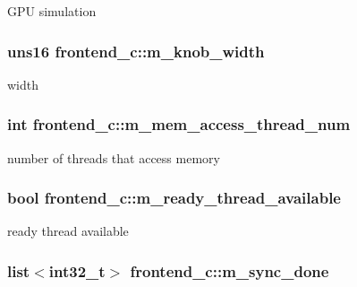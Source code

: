 \label{classfrontend__c_a30a952873e134a3f296ac90efee193f6}
GPU simulation \hypertarget{classfrontend__c_a7ed5014f79e26e431bff9ffa7b52121b}{
\subsubsection[{m\_\-knob\_\-width}]{\setlength{\rightskip}{0pt plus 5cm}uns16 {\bf frontend\_\-c::m\_\-knob\_\-width}}}
\label{classfrontend__c_a7ed5014f79e26e431bff9ffa7b52121b}
width \hypertarget{classfrontend__c_a172f7f7447242af7808f4a68821194d2}{
\subsubsection[{m\_\-mem\_\-access\_\-thread\_\-num}]{\setlength{\rightskip}{0pt plus 5cm}int {\bf frontend\_\-c::m\_\-mem\_\-access\_\-thread\_\-num}}}
\label{classfrontend__c_a172f7f7447242af7808f4a68821194d2}
number of threads that access memory \hypertarget{classfrontend__c_abe2dc05043fbc949b51dd87440ec1e5a}{
\subsubsection[{m\_\-ready\_\-thread\_\-available}]{\setlength{\rightskip}{0pt plus 5cm}bool {\bf frontend\_\-c::m\_\-ready\_\-thread\_\-available}}}
\label{classfrontend__c_abe2dc05043fbc949b51dd87440ec1e5a}
ready thread available \hypertarget{classfrontend__c_ac593d33a9e55678461f84b74a738fd3b}{
\subsubsection[{m\_\-sync\_\-done}]{\setlength{\rightskip}{0pt plus 5cm}list$<$int32\_\-t$>$ {\bf frontend\_\-c::m\_\-sync\_\-done}}}
